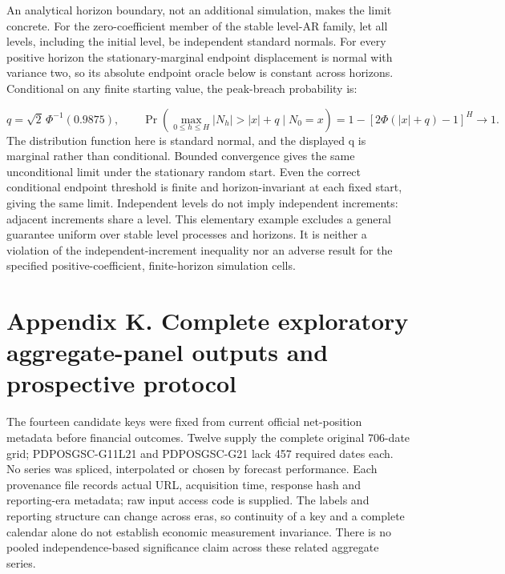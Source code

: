 \documentclass[10pt,a4paper]{article}
\begin{document}
An analytical horizon boundary, not an additional simulation, makes the limit concrete. For the zero-coefficient member of the stable level-AR family, let all levels, including the initial level, be independent standard normals. For every positive horizon the stationary-marginal endpoint displacement is normal with variance two, so its absolute endpoint oracle below is constant across horizons. Conditional on any finite starting value, the peak-breach probability is:

\[
q=\sqrt2\,\Phi^{-1}(0.9875),\qquad\Pr\!\left(\max_{0\le h\le H}|N_h|>|x|+q\mid N_0=x\right)=1-\left[2\Phi(|x|+q)-1\right]^H\longrightarrow1.
\]
The distribution function here is standard normal, and the displayed q is marginal rather than conditional. Bounded convergence gives the same unconditional limit under the stationary random start. Even the correct conditional endpoint threshold is finite and horizon-invariant at each fixed start, giving the same limit. Independent levels do not imply independent increments: adjacent increments share a level. This elementary example excludes a general guarantee uniform over stable level processes and horizons. It is neither a violation of the independent-increment inequality nor an adverse result for the specified positive-coefficient, finite-horizon simulation cells.

\section*{Appendix K. Complete exploratory aggregate-panel outputs and prospective protocol}
The fourteen candidate keys were fixed from current official net-position metadata before financial outcomes. Twelve supply the complete original 706-date grid; PDPOSGSC-G11L21 and PDPOSGSC-G21 lack 457 required dates each. No series was spliced, interpolated or chosen by forecast performance. Each provenance file records actual URL, acquisition time, response hash and reporting-era metadata; raw input access code is supplied. The labels and reporting structure can change across eras, so continuity of a key and a complete calendar alone do not establish economic measurement invariance. There is no pooled independence-based significance claim across these related aggregate series.
\end{document}
